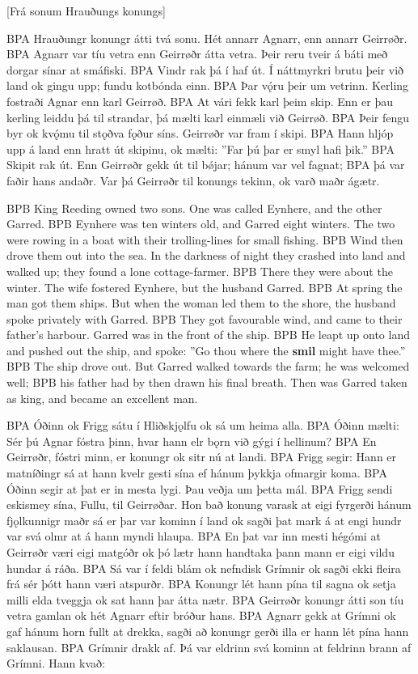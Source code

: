 [Frá sonum Hrauðungs konungs]

BPA Hrauðungr konungr átti tvá sonu. Hét annarr Agnarr, enn annarr Geirrøðr.
BPA Agnarr var tíu vetra enn Geirrøðr átta vetra. Þeir reru tveir á báti með dorgar sínar at smáfiski.
BPA Vindr rak þá í haf út. Í náttmyrkri brutu þeir við land ok gingu upp; fundu kotbónda einn.
BPA Þar vǫ́ru þeir um vetrinn. Kerling fostraði Agnar enn karl Geirrøð.
BPA At vári fekk karl þeim skip. Enn er þau kerling leiddu þá til strandar, þá mælti karl einmæli við Geirrøð.
BPA Þeir fengu byr ok kvǫ́mu til stǫðva fǫður síns. Geirrøðr var fram í skipi.
BPA Hann hljóp upp á land enn hratt út skipinu, ok mælti: ”Far þú þar er smyl hafi þik.”
BPA Skipit rak út. Enn Geirrøðr gekk út til bǿjar; hánum var vel fagnat;
BPA þá var faðir hans andaðr. Var þá Geirrøðr til konungs tekinn, ok varð maðr ágætr.

BPB King Reeding owned two sons. One was called Eynhere, and the other Garred.
BPB Eynhere was ten winters old, and Garred eight winters. The two were rowing in a boat with their trolling-lines for small fishing.
BPB Wind then drove them out into the sea. In the darkness of night they crashed into land and walked up; they found a lone cottage-farmer.
BPB There they were about the winter. The wife fostered Eynhere, but the husband Garred.
BPB At spring the man got them ships. But when the woman led them to the shore, the husband spoke privately with Garred.
BPB They got favourable wind, and came to their father's harbour. Garred was in the front of the ship.
BPB He leapt up onto land and pushed out the ship, and spoke: ”Go thou where the \textbf{smil} might have thee.”
BPB The ship drove out. But Garred walked towards the farm; he was welcomed well;
BPB his father had by then drawn his final breath. Then was Garred taken as king, and became an excellent man.

BPA Óðinn ok Frigg sátu í Hliðskjǫlfu ok sá um heima alla.
BPA Óðinn mælti: Sér þú Agnar fóstra þinn, hvar hann elr bǫrn við gýgi í hellinum?
BPA En Geirrøðr, fóstri minn, er konungr ok sitr nú at landi.
BPA Frigg segir: Hann er matníðingr sá at hann kvelr gesti sína ef hánum þykkja ofmargir koma.
BPA Óðinn segir at þat er in mesta lygi. Þau veðja um þetta mál.
BPA Frigg sendi eskismey sína, Fullu, til Geirrøðar. Hon bað konung varask at eigi fyrgerði hánum fjǫlkunnigr maðr sá er þar var kominn í land ok sagði þat mark á at engi hundr var svá olmr at á hann myndi hlaupa.
BPA En þat var inn mesti hégómi at Geirrøðr væri eigi matgóðr ok þó lætr hann handtaka þann mann er eigi vildu hundar á ráða.
BPA Sá var í feldi blám ok nefndisk Grímnir ok sagði ekki fleira frá sér þótt hann væri atspurðr.
BPA Konungr lét hann pína til sagna ok setja milli elda tveggja ok sat hann þar átta nætr.
BPA Geirrøðr konungr átti son tíu vetra gamlan ok hét Agnarr eftir bróður hans.
BPA Agnarr gekk at Grímni ok gaf hánum horn fullt at drekka, sagði að konungr gerði illa er hann lét pína hann saklausan.
BPA Grímnir drakk af. Þá var eldrinn svá kominn at feldrinn brann af Grímni. Hann kvað:

